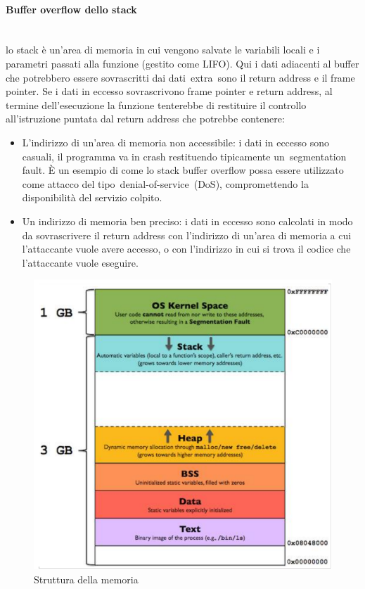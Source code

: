 \documentclass{article}
\begin{document}
\paragraph{Buffer overflow dello stack}
\noindent
\\
lo stack è un’area di memoria in cui vengono salvate le variabili locali e i parametri passati alla funzione 
(gestito come LIFO). Qui i dati adiacenti al buffer che potrebbero essere sovrascritti dai dati extra sono 
il return address e il frame pointer. Se i dati in eccesso sovrascrivono frame pointer e return address, 
al termine dell’esecuzione la funzione tenterebbe di restituire il controllo all’istruzione puntata dal 
return address che potrebbe contenere:
\begin{itemize}
    \item L’indirizzo di un’area di memoria non accessibile: i dati in eccesso sono casuali, il programma 
    va in crash restituendo tipicamente un segmentation fault. È un esempio di come lo stack buffer 
    overflow possa essere utilizzato come attacco del tipo denial-of-service (DoS), compromettendo la 
    disponibilità del servizio colpito.
    \item Un indirizzo di memoria ben preciso: i dati in eccesso sono calcolati in modo da sovrascrivere 
    il return address con l’indirizzo di un’area di memoria a cui l’attaccante vuole avere accesso, o con 
    l’indirizzo in cui si trova il codice che l’attaccante vuole eseguire.
\end{itemize}
\begin{figure}[H]
    \center
    \includegraphics[scale=0.3]{images/BO2.png}
    \caption{Struttura della memoria}\label{fig:1}
\end{figure}
\end{document}
